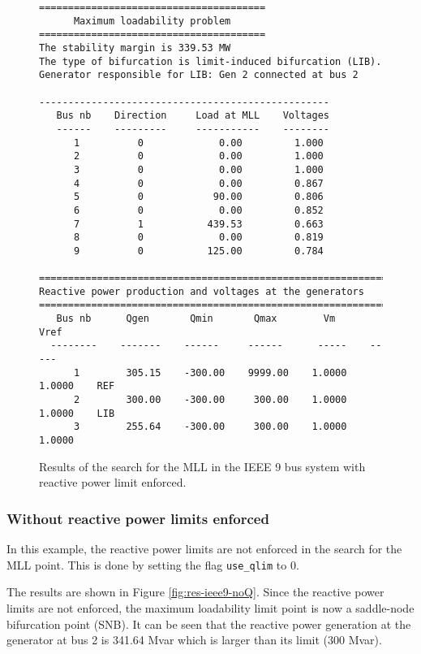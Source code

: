 \documentclass[12pt,a4]{article}
\newcommand*{\codemat}[1]{\texttt{#1}}
\begin{document}
\begin{figure}[!h]
  \centering
\begin{verbatim}
=======================================
      Maximum loadability problem
=======================================
The stability margin is 339.53 MW
The type of bifurcation is limit-induced bifurcation (LIB).
Generator responsible for LIB: Gen 2 connected at bus 2

--------------------------------------------------
   Bus nb    Direction     Load at MLL    Voltages 
   ------    ---------     -----------    --------
      1          0             0.00         1.000
      2          0             0.00         1.000
      3          0             0.00         1.000
      4          0             0.00         0.867
      5          0            90.00         0.806
      6          0             0.00         0.852
      7          1           439.53         0.663
      8          0             0.00         0.819
      9          0           125.00         0.784

=============================================================
Reactive power production and voltages at the generators
=============================================================
   Bus nb      Qgen       Qmin       Qmax        Vm      Vref
  --------    -------    ------     ------      -----    -----
      1        305.15    -300.00    9999.00    1.0000   1.0000    REF
      2        300.00    -300.00     300.00    1.0000   1.0000    LIB
      3        255.64    -300.00     300.00    1.0000   1.0000
\end{verbatim}  
  \caption{Results of the search for the MLL in the IEEE 9 bus system with reactive power limit enforced.}\label{fig:res-ieee9}
\end{figure}

\subsubsection{Without reactive power limits enforced}
\label{sec:with-react-power}

In this example, the reactive power limits are not enforced in the search for the MLL point. 
This is done by setting the flag \codemat{use\_qlim} to 0.



The results are shown in Figure \ref{fig:res-ieee9-noQ}.
Since the reactive power limits are not enforced, the maximum loadability limit point is now a saddle-node bifurcation point (SNB).
It can be seen that the reactive power generation at the generator at bus 2 is 341.64 Mvar which is larger than its limit (300 Mvar).
\end{document}
